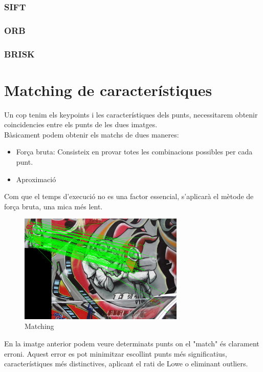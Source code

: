 	\subsubsection{SIFT}
	\subsubsection{ORB}
	\subsubsection{BRISK}

\newpage
\section{Matching de característiques}

	Un cop tenim els keypoints i les característiques dels punts, necessitarem obtenir coincidencies entre els punts de les dues imatges.\\
	Bàsicament podem obtenir els matchs de dues maneres:\\
	\begin{itemize}	
		\item{Força bruta: Consisteix en provar totes les combinacions possibles per cada punt.}
		\item{Aproximació}
	\end{itemize}
	Com que el temps d'execució no es una factor essencial, s'aplicarà el mètode de força bruta, una mica més lent.

	\begin{figure}[H]
		\centering
		\includegraphics[width=0.7\textwidth]{images/matching}
		\caption{Matching}
	\end{figure}
\noindent
	En la imatge anterior podem veure determinats punts on el "match" és clarament erroni. Aquest error es pot minimitzar escollint punts més significatius, característiques més distinctives, aplicant el rati
	de Lowe o eliminant outliers.

